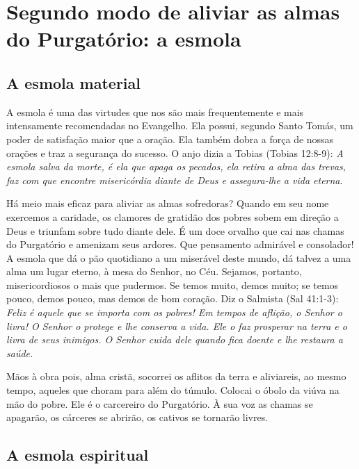 \renewcommand{\thechapterdisplay}{Vigésimo primeiro dia}
\renewcommand{\thechapterrunner}{Segundo modo de aliviar as almas do Purgatório: a esmola}
\chapter[Vigésimo primeiro dia --- Segundo modo de aliviar as almas do Purgatório: a esmola]{Segundo modo de aliviar as almas do Purgatório: a esmola}
\section*{A esmola material}

A esmola é uma das virtudes que nos são mais frequentemente e mais intensamente recomendadas no Evangelho. Ela possui, segundo Santo Tomás, um poder de satisfação maior que a oração. Ela também dobra a força de nossas orações e traz a segurança do sucesso. O anjo dizia a Tobias (Tobias 12:8-9): \textit{A esmola salva da morte, é ela que apaga os pecados, ela retira a alma das trevas, faz com que encontre misericórdia diante de Deus e assegura-lhe a vida eterna}.

Há meio mais eficaz para aliviar as almas sofredoras? Quando em seu nome exercemos a caridade, os clamores de gratidão dos pobres sobem em direção a Deus e triunfam sobre tudo diante dele. É um doce orvalho que cai nas chamas do Purgatório e amenizam seus ardores.
Que pensamento admirável e consolador! A esmola que dá o pão quotidiano a um miserável deste mundo, dá talvez a uma alma um lugar eterno, à mesa do Senhor, no Céu. Sejamos, portanto, misericordiosos o mais que pudermos. Se temos muito, demos muito; se temos pouco, demos pouco, mas demos de bom coração. Diz o Salmista (Sal 41:1-3): \textit{Feliz é aquele que se importa com os pobres! Em tempos de aflição, o Senhor o livra! O Senhor o protege e lhe conserva a vida. Ele o faz prosperar na terra e o livra de seus inimigos. O Senhor cuida dele quando fica doente e lhe restaura a saúde.}

Mãos à obra pois, alma cristã, socorrei os aflitos da terra e aliviareis, ao mesmo tempo, aqueles que choram para além do túmulo. Colocai o óbolo da viúva na mão do pobre. Ele é o carcereiro do Purgatório. À sua voz as chamas se apagarão, os cárceres se abrirão, os cativos se tornarão livres.


\section*{A esmola espiritual}

